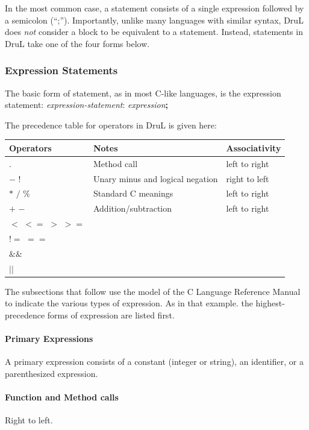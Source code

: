\documentclass[11pt,twoside]{article}
\begin{document}
In the most common case, a statement consists of a single expression followed by a semicolon (``;'').  Importantly, unlike many languages with similar syntax, DruL does \emph{not} consider a block to be equivalent to a statement.  Instead, statements in DruL take one of the four forms below.



\subsubsection{Expression Statements}

The basic form of statement, as in most C-like languages, is the expression statement: \emph{expression-statement}: \emph{expression}\textbf{;}

The precedence table for operators in DruL is given here:

\begin{tabular}{ l |l| l}
\hline\hline
Operators & Notes & Associativity \\
\hline $ . $ & Method call & left to right \\
$-$  $!$ &Unary minus and logical negation & right to left \\
$*$ $/$ $\%$ & Standard C meanings & left to right \\
$+$ $-$ & Addition/subtraction & left to right \\
$<$ $<=$ $>$ $>=$ &  &  \\
$!=$ $==$ &  & \\
$\&\&$ &  & \\
$||$ &  & \\
\end{tabular}

The subsections that follow use the model of the C Language Reference Manual to indicate the various types of expression.  As in that example. the highest-precedence forms of expression are listed first.

\paragraph{Primary Expressions}

A primary expression consists of a constant (integer or string), an identifier, or a parenthesized expression.

\paragraph{Function and Method calls}
Right to left.
\end{document}
